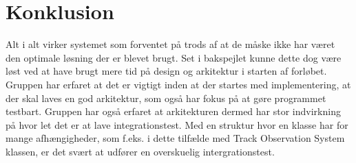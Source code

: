 \section{Konklusion}
Alt i alt virker systemet som forventet på trods af at de måske ikke har været den optimale løsning der er blevet brugt. \tabularnewline
Set i bakspejlet kunne dette dog være løst ved at have brugt mere tid på design og arkitektur i starten af forløbet.  \tabularnewline
Gruppen har erfaret at det er vigtigt inden at der startes med implementering, at der skal laves en god arkitektur,
som også har fokus på at gøre programmet testbart. \tabularnewline
Gruppen har også erfaret at arkitekturen dermed har stor indvirkning på hvor let det er at lave integrationstest. Med en struktur hvor 
en klasse har for mange afhængigheder, som f.eks. i dette tilfælde med Track Observation System klassen, er det svært at udfører en overskuelig
intergrationstest.